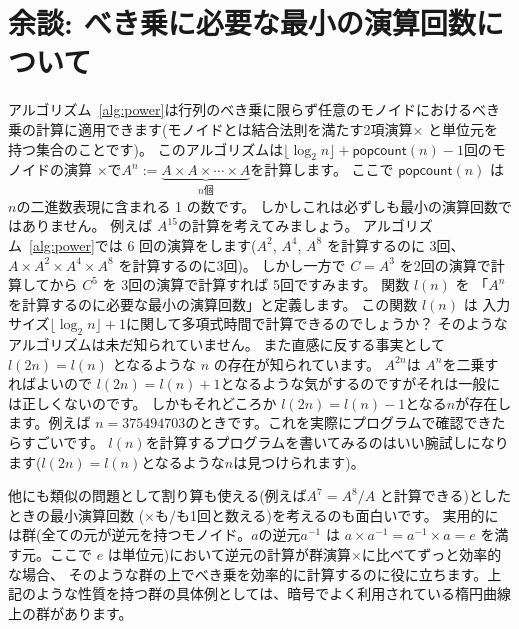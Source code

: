 \documentclass[a4paper,twoside,onecolumn,openany,article]{memoir}
\theoremstyle{plain}
\theoremstyle{remark}
\newtheorem{remark}{\bf 余談}
\begin{document}
\section*{余談: べき乗に必要な最小の演算回数について}
アルゴリズム~\ref{alg:power}は行列のべき乗に限らず任意のモノイドにおけるべき乗の計算に適用できます(モノイドとは結合法則を満たす2項演算$\times$ と単位元を持つ集合のことです)。
このアルゴリズムは$\lfloor \log_2 n\rfloor + \mathsf{popcount}(n) - 1$回のモノイドの演算 $\times$で$A^n := \underbrace{A\times A\times \dotsm \times A}_{n\text{個}}$を計算します。
ここで $\mathsf{popcount}(n)$ は $n$の二進数表現に含まれる 1 の数です。
しかしこれは必ずしも最小の演算回数ではありません。
例えば $A^{15}$の計算を考えてみましょう。
アルゴリズム~\ref{alg:power}では 6 回の演算をします($A^2$, $A^4$, $A^8$ を計算するのに 3回、$A \times A^2 \times A^4 \times A^8$ を計算するのに3回)。
しかし一方で $C=A^3$ を2回の演算で計算してから $C^5$ を 3回の演算で計算すれば 5回ですみます。
関数 $l(n)$ を 「$A^n$ を計算するのに必要な最小の演算回数」と定義します。
この関数 $l(n)$ は 入力サイズ$\lfloor\log_2 n\rfloor+1$に関して多項式時間で計算できるのでしょうか？
そのようなアルゴリズムは未だ知られていません。
また直感に反する事実として $l(2n)=l(n)$ となるような $n$ の存在が知られています。
$A^{2n}$は $A^n$を二乗すればよいので $l(2n)= l(n)+1$となるような気がするのですがそれは一般には正しくないのです。
しかもそれどころか $l(2n) = l(n)-1$となる$n$が存在します。例えば $n=375494703$のときです。これを実際にプログラムで確認できたらすごいです。
$l(n)$を計算するプログラムを書いてみるのはいい腕試しになります($l(2n)=l(n)$となるような$n$は見つけられます)。

他にも類似の問題として割り算も使える(例えば$A^7 = A^8 / A$ と計算できる)としたときの最小演算回数 ($\times$も$/$も1回と数える)を考えるのも面白いです。
実用的には群(全ての元が逆元を持つモノイド。$a$の逆元$a^{-1}$ は $a \times a^{-1} = a^{-1} \times a = e$ を満す元。ここで $e$ は単位元)において逆元の計算が群演算$\times$に比べてずっと効率的な場合、
そのような群の上でべき乗を効率的に計算するのに役に立ちます。上記のような性質を持つ群の具体例としては、暗号でよく利用されている楕円曲線上の群があります。
\end{document}
